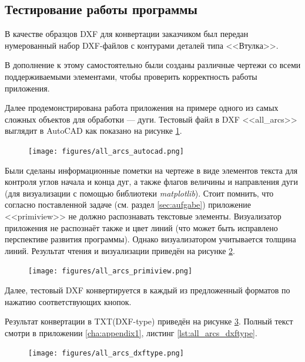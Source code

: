 \subsection{Тестирование работы программы}

В качестве образцов DXF для конвертации заказчиком был передан нумерованный набор DXF-файлов с контурами деталей типа <<Втулка>>.

В дополнение к этому самостоятельно были созданы различные чертежи со всеми поддерживаемыми элементами, чтобы проверить корректность работы приложения.

Далее продемонстрирована работа приложения на примере одного из самых сложных объектов для обработки --- дуги. Тестовый файл в DXF <<all\_arcs>> выглядит в AutoCAD как показано на рисунке \ref{fig:all_arcs_autocad}.

\begin{figure}[H]
	\centering
	\texttt{[image: figures/all\_arcs\_autocad.png]}
	\label{fig:all_arcs_autocad}
\end{figure}

Были сделаны информационные пометки на чертеже в виде элементов текста для контроля углов начала и конца дуг, а также флагов величины и направления дуги (для визуализации с помощью библиотеки \textit{matplotlib}). Стоит помнить, что согласно поставленной задаче (см. раздел \ref{sec:aufgabe}) приложение <<primiview>> не должно распознавать текстовые элементы. Визуализатор приложения не распознаёт также и цвет линий (что может быть исправлено перспективе развития программы). Однако визуализатором учитывается толщина линий. Результат чтения и визуализации приведён на рисунке \ref{fig:all_arcs_primiview}.

\begin{figure}[H]
	\centering
	\texttt{[image: figures/all\_arcs\_primiview.png]}
	\label{fig:all_arcs_primiview}
\end{figure}

Далее, тестовый DXF конвертируется в каждый из предложенный форматов по нажатию соответствующих кнопок.

Результат конвертации в TXT(DXF-type) приведён на рисунке \ref{fig:all_arcs_dxftype}. Полный текст смотри в приложении \ref{cha:appendix1}, листинг \ref{lst:all_arcs_dxftype}.

\begin{figure}[H]
	\centering
	\texttt{[image: figures/all\_arcs\_dxftype.png]}
	\label{fig:all_arcs_dxftype}
\end{figure}

